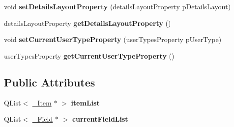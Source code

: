 \begin{DoxyCompactItemize}
\item 
\hypertarget{classQEConfiguredLayout_af7d2858e2a3d1db165b5c1de8675838b}{
void {\bfseries setDetailsLayoutProperty} (detailsLayoutProperty pDetailsLayout)}
\label{classQEConfiguredLayout_af7d2858e2a3d1db165b5c1de8675838b}

\item 
\hypertarget{classQEConfiguredLayout_a73079f90158a77bc92b7acf278cc9e7b}{
detailsLayoutProperty {\bfseries getDetailsLayoutProperty} ()}
\label{classQEConfiguredLayout_a73079f90158a77bc92b7acf278cc9e7b}

\item 
\hypertarget{classQEConfiguredLayout_a312bd9165ea847a9826e51d599184c90}{
void {\bfseries setCurrentUserTypeProperty} (userTypesProperty pUserType)}
\label{classQEConfiguredLayout_a312bd9165ea847a9826e51d599184c90}

\item 
\hypertarget{classQEConfiguredLayout_af25a48ad62902ae667431eeb4d761c30}{
userTypesProperty {\bfseries getCurrentUserTypeProperty} ()}
\label{classQEConfiguredLayout_af25a48ad62902ae667431eeb4d761c30}

\end{DoxyCompactItemize}
\subsection*{Public Attributes}
\begin{DoxyCompactItemize}
\item 
\hypertarget{classQEConfiguredLayout_a5f274891828c6e0d7180bc91f3e2d87a}{
QList$<$ \hyperlink{class__Item}{\_\-Item} $\ast$ $>$ {\bfseries itemList}}
\label{classQEConfiguredLayout_a5f274891828c6e0d7180bc91f3e2d87a}

\item 
\hypertarget{classQEConfiguredLayout_a59a9105a498867cc5f78950c1388739c}{
QList$<$ \hyperlink{class__Field}{\_\-Field} $\ast$ $>$ {\bfseries currentFieldList}}
\label{classQEConfiguredLayout_a59a9105a498867cc5f78950c1388739c}

\end{DoxyCompactItemize}
